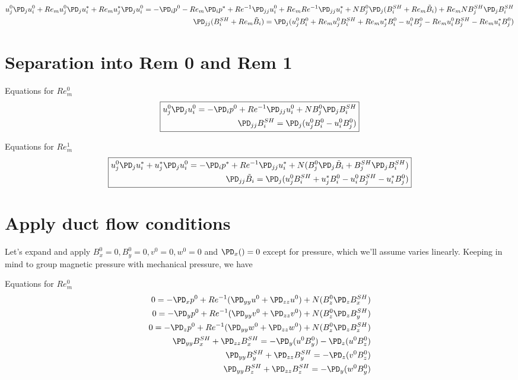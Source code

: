\documentclass[11pt]{article}
\newcommand{\BS}{B^{SH}}
\newcommand{\BT}{\tilde{B}}
\begin{document}
\tiny\begin{equation}\begin{aligned}
u_j^0 \PD_j u_i^0 +
Re_m u_j^0 \PD_j u_i^* +
Re_m u_j^* \PD_j u_i^0
= -\PD_i p^0 - Re_m\PD_i p^*+ Re^{-1} \PD_{jj} u_i^0 + Re_m Re^{-1} \PD_{jj} u_i^* + N B_j^0 \PD_j (\BS_i+Re_m \BT_i) + Re_m N \BS_j \PD_j \BS_i \\
\PD_{jj} (\BS_i+Re_m \BT_i) = \PD_j ( u_j^0 B_i^0 + Re_m u_j^0 \BS_i + Re_m u_j^* B_i^0 - u_i^0 B_j^0 - Re_m u_i^0 \BS_j - Re_m u_i^* B_j^0)
\end{aligned}\end{equation}\normalsize

\section{Separation into Rem 0 and Rem 1}
Equations for $Re_m^0$
\begin{equation}\boxed{\begin{aligned}
u_j^0 \PD_j u_i^0 = -\PD_i p^0 + Re^{-1} \PD_{jj} u_i^0 + N B_j^0 \PD_j \BS_i \\
\PD_{jj} \BS_i = \PD_j ( u_j^0 B_i^0 - u_i^0 B_j^0)
\end{aligned}}\end{equation}

Equations for $Re_m^1$
\begin{equation}\boxed{\begin{aligned}
u_j^0 \PD_j u_i^* + u_j^* \PD_j u_i^0 = -\PD_i p^*+ Re^{-1} \PD_{jj} u_i^* + N ( B_j^0 \PD_j \BT_i + \BS_j \PD_j \BS_i ) \\
\PD_{jj} \BT_i = \PD_j ( u_j^0 \BS_i + u_j^* B_i^0 - u_i^0 \BS_j - u_i^* B_j^0)
\end{aligned}}\end{equation}

\section{Apply duct flow conditions}
Let's expand and apply $B_x^0 = 0,B_y^0 = 0, v^0 = 0, w^0 = 0$ and $\PD_x() = 0$ except for pressure, which we'll assume varies linearly.
Keeping in mind to group magnetic pressure with mechanical pressure, we have

Equations for $Re_m^0$
\begin{equation}\begin{aligned}
0 = -\PD_x p^0 + Re^{-1} (\PD_{yy} u^0 + \PD_{zz} u^0) + N (B_z^0 \PD_z \BS_x) \\
0 = -\PD_y p^0 + Re^{-1} (\PD_{yy} v^0 + \PD_{zz} v^0) + N (B_z^0 \PD_z \BS_y) \\
0 = -\PD_z p^0 + Re^{-1} (\PD_{yy} w^0 + \PD_{zz} w^0) + N (B_z^0 \PD_z \BS_z) \\
\PD_{yy} \BS_x + \PD_{zz} \BS_x = - \PD_y ( u^0 B_y^0) - \PD_z ( u^0 B_z^0) \\
\PD_{yy} \BS_y + \PD_{zz} \BS_y = - \PD_z ( v^0 B_z^0) \\
\PD_{yy} \BS_z + \PD_{zz} \BS_z = - \PD_y ( w^0 B_y^0) \\
\end{aligned}\end{equation}
\end{document}
